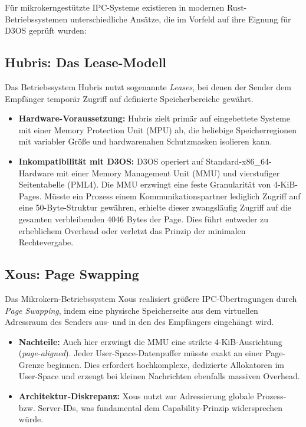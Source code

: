 Für mikrokerngestützte IPC-Systeme existieren in modernen Rust-Betriebssystemen unterschiedliche Ansätze, die im Vorfeld auf ihre Eignung für D3OS geprüft wurden:

\subsection{Hubris: Das Lease-Modell}

Das Betriebssystem Hubris nutzt sogenannte \textit{Leases}, bei denen der Sender dem Empfänger temporär Zugriff auf definierte Speicherbereiche gewährt.

\begin{itemize}
    \item \textbf{Hardware-Voraussetzung:} Hubris zielt primär auf eingebettete Systeme mit einer Memory Protection Unit (MPU) ab, die beliebige Speicherregionen mit variabler Größe und hardwarenahen Schutzmasken isolieren kann.
    \item \textbf{Inkompatibilität mit D3OS:} D3OS operiert auf Standard-x86\_64-Hardware mit einer Memory Management Unit (MMU) und vierstufiger Seitentabelle (PML4). Die MMU erzwingt eine feste Granularität von 4-KiB-Pages. Müsste ein Prozess einem Kommunikationspartner lediglich Zugriff auf eine 50-Byte-Struktur gewähren, erhielte dieser zwangsläufig Zugriff auf die gesamten verbleibenden 4046 Bytes der Page. Dies führt entweder zu erheblichem Overhead oder verletzt das Prinzip der minimalen Rechtevergabe.
\end{itemize}

\subsection{Xous: Page Swapping}

Das Mikrokern-Betriebssystem Xous realisiert größere IPC-Übertragungen durch \textit{Page Swapping}, indem eine physische Speicherseite aus dem virtuellen Adressraum des Senders aus- und in den des Empfängers eingehängt wird.

\begin{itemize}
    \item \textbf{Nachteile:} Auch hier erzwingt die MMU eine strikte 4-KiB-Ausrichtung (\textit{page-aligned}). Jeder User-Space-Datenpuffer müsste exakt an einer Page-Grenze beginnen. Dies erfordert hochkomplexe, dedizierte Allokatoren im User-Space und erzeugt bei kleinen Nachrichten ebenfalls massiven Overhead.
    \item \textbf{Architektur-Diskrepanz:} Xous nutzt zur Adressierung globale Prozess- bzw. Server-IDs, was fundamental dem Capability-Prinzip widersprechen würde.
\end{itemize}


